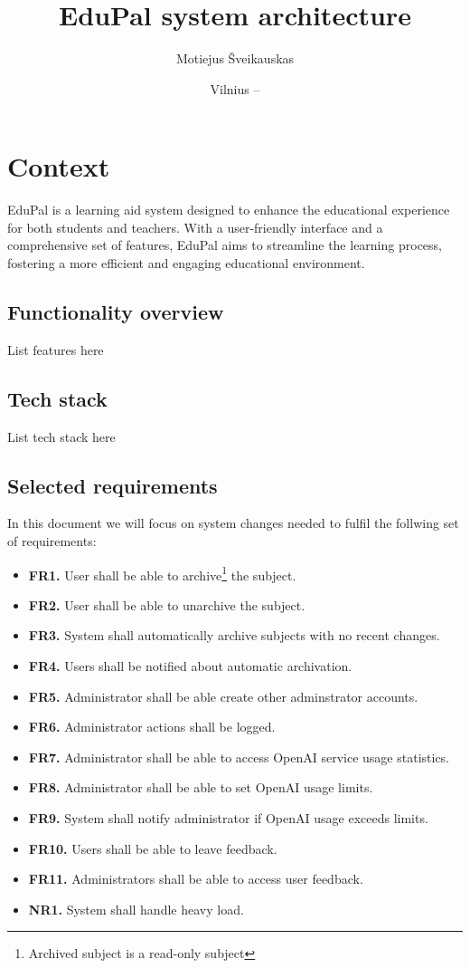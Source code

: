 \documentclass[
    english, %
]{VUMIFPSkursinis}
\title{EduPal system architecture}
\author{Motiejus Šveikauskas}
\date{Vilnius – \the\year}
\begin{document}
\maketitle

\tableofcontents

\section{Context}
EduPal is a learning aid system designed to enhance
the educational experience for both students and teachers. With a user-friendly interface and a comprehensive set of features, EduPal aims to streamline the learning process, fostering a more efficient and engaging educational environment.

\subsection{Functionality overview}
List features here

\subsection{Tech stack}
List tech stack here

\subsection{Selected requirements}
In this document we will focus on system changes needed to fulfil the follwing set of requirements:

\begin{itemize}
    \item \textbf{FR1.} User shall be able to archive\footnote{Archived subject is a read-only subject} the subject.
    \item \textbf{FR2.} User shall be able to unarchive the subject.
    \item \textbf{FR3.} System shall automatically archive subjects with no recent changes.
    \item \textbf{FR4.} Users shall be notified about automatic archivation.
    \item \textbf{FR5.} Administrator shall be able create other adminstrator accounts.
    \item \textbf{FR6.} Administrator actions shall be logged.
    \item \textbf{FR7.} Administrator shall be able to access OpenAI service usage statistics.
    \item \textbf{FR8.} Administrator shall be able to set OpenAI usage limits.
    \item \textbf{FR9.} System shall notify administrator if OpenAI usage exceeds limits.
    \item \textbf{FR10.} Users shall be able to leave feedback.
    \item \textbf{FR11.} Administrators shall be able to access user feedback.
    \item \textbf{NR1.} System shall handle heavy load.
\end{itemize}
\end{document}
